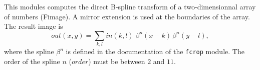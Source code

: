 This modules computes the direct B-spline transform of a two-dimensionnal
array of numbers (Fimage). A mirror extension is used at the boundaries of
the array.
The result image is
$$out(x,y) = \sum_{k,l} in(k,l) \;\beta^n(x-k) \, \beta^n(y-l),$$
where the spline $\beta^n$ is defined in the documentation 
of the \verb+fcrop+ module.
The order of the spline $n$ ($order$) must be between $2$ and $11$.
